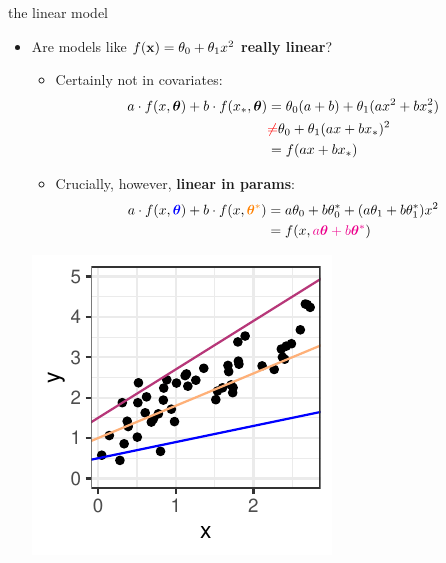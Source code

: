 \documentclass[11pt,compress,t,notes=noshow, xcolor=table]{beamer}
\begin{document}
\begin{vbframe}{the linear model}

\begin{itemize}
\item Are models like $f(\mathbf{x}) = \theta_0 + \theta_1 x^2$ 
  \textbf{really linear}?
\begin{minipage}[b]{0.7\textwidth}
  \vspace{0.3cm}
  \begin{itemize}
    \item Certainly not in covariates: 
    \scriptsize
    \begin{align*}
      a \cdot f(x, \bm{\theta}) + b \cdot f(x_\ast, \bm{\theta}) 
      &= \theta_0 (a + b) + \theta_1(a x^2 + b x_\ast^2) \\
      &\textcolor{red}{\neq} \theta_0 + \theta_1 (a x + b  x_\ast)^2\\
      &= f(a  x + b x_\ast)
    \end{align*}
    \normalsize
    \item Crucially, however, \textbf{linear in params}:
    \scriptsize
    \begin{align*}
      a \cdot f(x, \textcolor{blue}{\bm{\theta}}) + 
      b \cdot f(x, \textcolor{orange}{\bm{\theta}^\ast}) 
      &= a \theta_0 + b \theta_0^\ast + (a \theta_1 + b \theta_1^\ast) x^2 \\
      &= f(x, \textcolor{magenta}{a \bm{\theta} + b \bm{\theta}^\ast})
    \end{align*}
  \end{itemize}
\end{minipage}
\begin{minipage}[b]{0.2\textwidth}
  \includegraphics[width=\textwidth]{figure/reg_poly_linearity}

\end{minipage}
\end{itemize}
\end{vbframe}
\end{document}
